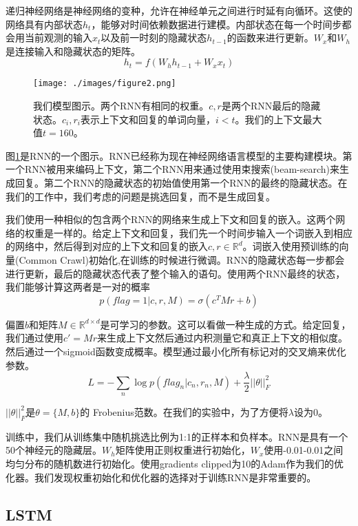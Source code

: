 \documentclass{article}
\begin{document}
\begin{multicols}{2}
		递归神经网络是神经网络的变种，允许在神经单元之间进行时延有向循环。这使的网络具有内部状态$h_t$，能够对时间依赖数据进行建模。内部状态在每一个时间步都会用当前观测的输入$x_t$以及前一时刻的隐藏状态$h_{t-1}$的函数来进行更新。$W_x$和$W_h$是连接输入和隐藏状态的矩阵。
		$$h_t = f(W_h h_{t-1} + W_x x_t)$$
		
		
		\begin{figure}[H]
			\centering
			\texttt{[image: ./images/figure2.png]}
			\caption{我们模型图示。两个RNN有相同的权重。$c,r$是两个RNN最后的隐藏状态。$c_i,r_i$表示上下文和回复的单词向量，$i < t $。我们的上下文最大值$t = 160 $。}
			\label{模型示意图}
		\end{figure}
		
		图\ref{模型示意图}是RNN的一个图示。RNN已经称为现在神经网络语言模型的主要构建模块。第一个RNN被用来编码上下文，第二个RNN用来通过使用束搜索(beam-search)来生成回复。第二个RNN的隐藏状态的初始值使用第一个RNN的最终的隐藏状态。在我们的工作中，我们考虑的问题是挑选回复，而不是生成回复。
		
		我们使用一种相似的包含两个RNN的网络来生成上下文和回复的嵌入。这两个网络的权重是一样的。给定上下文和回复，我们先一个时间步输入一个词嵌入到相应的网络中，然后得到对应的上下文和回复的嵌入$c,r \in \mathbb{R}^d$。词嵌入使用预训练的向量(Common Crawl)初始化,在训练的时候进行微调。RNN的隐藏状态每一步都会进行更新，最后的隐藏状态代表了整个输入的语句。使用两个RNN最终的状态，我们能够计算这两者是一对的概率
		$$p(flag = 1 | c,r,M) = \sigma ( c^T M r + b)$$
		
		偏置$b$和矩阵$M \in  \mathbb{R}^{d \times d}$是可学习的参数。这可以看做一种生成的方式。给定回复，我们通过使用$c' = Mr$来生成上下文然后通过内积测量它和真正上下文的相似度。然后通过一个sigmoid函数变成概率。模型通过最小化所有标记对的交叉熵来优化参数。
		$$L = -\sum_n{\log p(flag_n | c_n, r_n, M)} + \frac{\lambda}{2} ||\theta||_F^2$$
		
		$||\theta||_F^2$是$\theta = \{M ,b \}$的 Frobenius范数。在我们的实验中，为了方便将$\lambda$设为0。
		
		训练中，我们从训练集中随机挑选比例为1:1的正样本和负样本。RNN是具有一个50个神经元的隐藏层。$W_h$矩阵使用正则权重进行初始化，$W_x$使用-0.01-0.01之间均匀分布的随机数进行初始化。使用gradients clipped为10的Adam作为我们的优化器。我们发现权重初始化和优化器的选择对于训练RNN是非常重要的。
		
		\subsection{LSTM}
		

\end{multicols}
\end{document}
